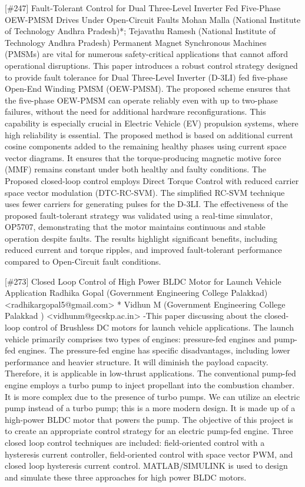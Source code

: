 {} \begin{abstract_online} {[\#247] Fault-Tolerant Control for Dual Three-Level Inverter Fed Five-Phase OEW-PMSM Drives Under Open-Circuit Faults } {} {Mohan Malla (National Institute of Technology Andhra Pradesh)*; Tejavathu  Ramesh (National Institute of Technology Andhra Pradesh)} {} Permanent Magnet Synchronous Machines (PMSMs) are vital for numerous safety-critical applications that cannot afford operational disruptions. This paper introduces a robust control strategy designed to provide fault tolerance for Dual Three-Level Inverter (D-3LI) fed five-phase Open-End Winding PMSM (OEW-PMSM). The proposed scheme ensures that the five-phase OEW-PMSM can operate reliably even with up to two-phase failures, without the need for additional hardware reconfigurations. This capability is especially crucial in Electric Vehicle (EV) propulsion systems, where high reliability is essential. The proposed method is based on additional current cosine components added to the remaining healthy phases using current space vector diagrams. It ensures that the torque-producing magnetic motive force (MMF) remains constant under both healthy and faulty conditions. The Proposed closed-loop control employs Direct Torque Control with reduced carrier space vector modulation (DTC-RC-SVM). The simplified RC-SVM technique uses fewer carriers for generating pulses for the D-3LI. The effectiveness of the proposed fault-tolerant strategy was validated using a real-time simulator, OP5707, demonstrating that the motor maintains continuous and stable operation despite faults. The results highlight significant benefits, including reduced current and torque ripples, and improved fault-tolerant performance compared to Open-Circuit fault conditions. \end{abstract_online} 
 {} \begin{abstract_online} {[\#273] Closed Loop Control of High Power BLDC Motor  for Launch Vehicle Application} {} {Radhika Gopal (Government Engineering College Palakkad) <radhikargopal5@gmail.com> *
Vidhun M (Government Engineering College Palakkad ) <vidhunm@gecskp.ac.in> } {} -This paper discussing about the closed-loop control of Brushless DC motors for launch vehicle applications. The launch vehicle primarily comprises two types of engines: pressure-fed engines and pump-fed engines. The pressure-fed engine has specific disadvantages, including lower performance and heavier structure. It will diminish the payload capacity. Therefore, it is applicable in low-thrust applications. The conventional pump-fed engine employs a turbo pump to inject propellant into the combustion chamber. It is more complex due to the presence of turbo pumps. We can utilize an electric pump instead of a turbo pump; this is a more modern design. It is made up of a high-power BLDC motor that powers the pump. The objective of this project is to create an appropriate control strategy for an electric pump-fed engine. Three closed loop control techniques are included: field-oriented control with a hysteresis current controller, field-oriented control with space vector PWM, and closed loop hysteresis current control. MATLAB/SIMULINK is used to design and simulate these three approaches for high power BLDC motors. \end{abstract_online}  
